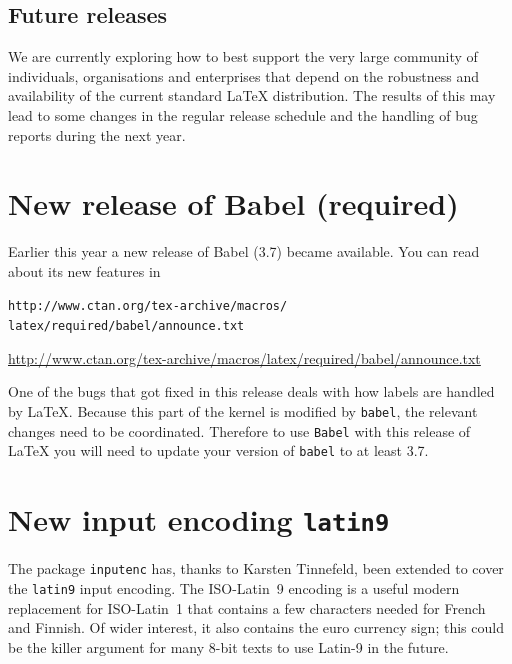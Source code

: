 \documentclass{ltnews}
\providecommand\pkg[1]{\texttt{#1}}
\providecommand\option[1]{\texttt{#1}}
\providecommand\file[1]{\texttt{#1}}
\begin{document}
\maketitle

\raisefirstsection
\subsection{Future releases}

We are currently exploring how to best support the very large
community of individuals, organisations and enterprises that depend on
the robustness and availability of the current standard \LaTeX{}
distribution.  The results of this may lead to some changes in the
regular release schedule and the handling of bug reports during the
next year.

\section{New release of \textsf{Babel} (required)}

Earlier this year a new release of \textsf{Babel} (3.7) became
available. You can read about its new features in
\begin{latexonly}
  \file{http://www.ctan.org/tex-archive/macros/}\\
  \hspace*{4em}\file{latex/required/babel/announce.txt}
\end{latexonly}
\begin{htmlonly}
  \url{http://www.ctan.org/tex-archive/macros/latex/required/babel/announce.txt}
\end{htmlonly}

One of the bugs that got fixed in this release deals with how labels
are handled by \LaTeX{}.  Because this part of the kernel is modified
by \pkg{babel}, the relevant changes need to be coordinated.
Therefore to use \pkg{Babel} with this release of \LaTeX{} you will
need to update your version of \pkg{babel} to at least 3.7.

\section{New input encoding \option{latin9}}

The package \pkg{inputenc} has, thanks to Karsten Tinnefeld, been
extended to cover the \option{latin9} input encoding.  The
ISO-Latin~9 encoding is a useful modern replacement for ISO-Latin~1
that contains a few characters needed for French and Finnish. Of wider
interest, it also contains the euro currency sign; this could be the
killer argument for many 8-bit texts to use Latin-9 in the future.
\end{document}
